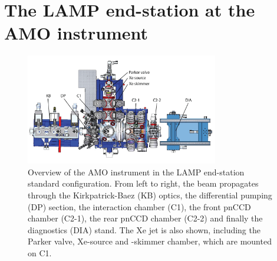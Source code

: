 \section{The LAMP end-station at the AMO instrument}\label{sec:LAMP-endstation}
\begin{figure}
	\centering
		\includegraphics[width=0.75\textwidth]{images/AMO-overview-4.png}
	\caption[Overview of the AMO instrument in the LAMP end-station configuration.]{Overview of the AMO instrument in the LAMP end-station standard configuration. From left to right, the beam propagates through the Kirkpatrick-Baez (KB) optics, the differential pumping (DP) section, the interaction chamber (C1), the front pnCCD chamber (C2-1), the rear pnCCD chamber (C2-2) and finally the diagnostics (DIA) stand. The Xe jet is also shown, including the Parker valve, Xe-source and -skimmer chamber, which are mounted on C1.
}
	\label{fig:LAMP-overview}
\end{figure}
%
